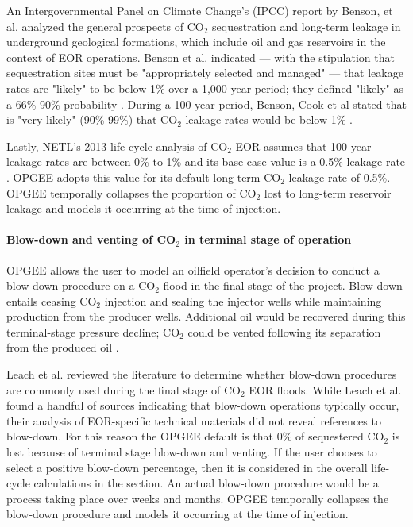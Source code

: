 \documentclass[11pt]{report}
\begin{document}
An Intergovernmental Panel on Climate Change's (IPCC) report by Benson, et al. \cite{Benson2005} analyzed the general prospects of CO$_2$ sequestration and long-term leakage in underground geological formations, which include oil and gas reservoirs in the context of EOR operations. Benson et al. indicated --- with the stipulation that sequestration sites must be "appropriately selected and managed" --- that leakage rates are "likely" to be below 1\% over a 1,000 year period; they defined "likely" as a 66\%-90\% probability \cite{Benson2005}. During a 100 year period, Benson, Cook et al stated that is "very likely" (90\%-99\%) that CO$_2$ leakage rates would be below 1\% \cite{Benson2005}.

Lastly, NETL's 2013 life-cycle analysis of CO$_2$ EOR assumes that 100-year leakage rates are between 0\% to 1\% and its base case value is a 0.5\% leakage rate \cite{NETL2013}. OPGEE adopts this value for its default long-term CO$_2$ leakage rate of 0.5\%. OPGEE temporally collapses the proportion of CO$_2$ lost to long-term reservoir leakage and models it occurring at the time of injection.  

\paragraph{Blow-down and venting of CO$_2$ in terminal stage of operation} \label{par:Blowdown}
OPGEE allows the user to model an oilfield operator's decision to conduct a blow-down procedure on a CO$_2$ flood in the final stage of the project. Blow-down entails ceasing CO$_2$ injection and sealing the injector wells while maintaining production from the producer wells. Additional oil would be recovered during this terminal-stage pressure decline; CO$_2$ could be vented following its separation from the produced oil \cite{Stevens1999}. 

Leach et al. \cite{Leach2011} reviewed the literature to determine whether blow-down procedures are commonly used during the final stage of CO$_2$ EOR floods. While Leach et al. \cite{Leach2011} found a handful of sources indicating that blow-down operations typically occur, their analysis of EOR-specific technical materials did not reveal references to blow-down. For this reason the OPGEE default is that 0\% of sequestered CO$_2$ is lost because of terminal stage blow-down and venting. If the user chooses to select a positive blow-down percentage, then it is considered in the overall life-cycle calculations in the  section. An actual blow-down procedure would be a process taking place over weeks and months. OPGEE temporally collapses the blow-down procedure and models it occurring at the time of injection.  
\end{document}
